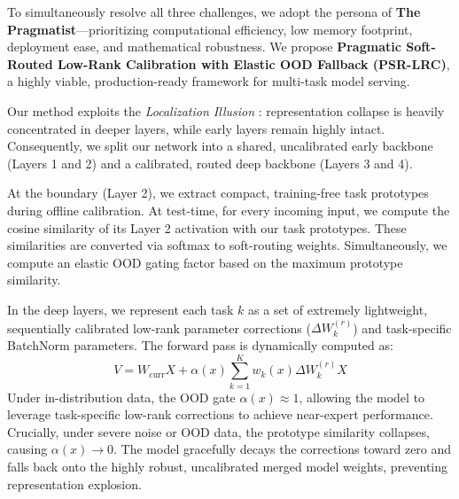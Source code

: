 \documentclass{article}
\theoremstyle{plain}
\theoremstyle{definition}
\theoremstyle{remark}
\begin{document}
To simultaneously resolve all three challenges, we adopt the persona of \textbf{The Pragmatist}—prioritizing computational efficiency, low memory footprint, deployment ease, and mathematical robustness. We propose \textbf{Pragmatic Soft-Routed Low-Rank Calibration with Elastic OOD Fallback (PSR-LRC)}, a highly viable, production-ready framework for multi-task model serving.

Our method exploits the \emph{Localization Illusion} \cite{minimalist2026mspr}: representation collapse is heavily concentrated in deeper layers, while early layers remain highly intact. Consequently, we split our network into a shared, uncalibrated early backbone (Layers 1 and 2) and a calibrated, routed deep backbone (Layers 3 and 4). 

At the boundary (Layer 2), we extract compact, training-free task prototypes during offline calibration. At test-time, for every incoming input, we compute the cosine similarity of its Layer 2 activation with our task prototypes. These similarities are converted via softmax to soft-routing weights. Simultaneously, we compute an elastic OOD gating factor based on the maximum prototype similarity.

In the deep layers, we represent each task $k$ as a set of extremely lightweight, sequentially calibrated low-rank parameter corrections ($\Delta W_k^{(r)}$) and task-specific BatchNorm parameters. The forward pass is dynamically computed as:
\begin{equation}
    V = W_{\text{curr}} X + \alpha(x) \sum_{k=1}^K w_k(x) \Delta W_k^{(r)} X
\end{equation}
Under in-distribution data, the OOD gate $\alpha(x) \approx 1$, allowing the model to leverage task-specific low-rank corrections to achieve near-expert performance. Crucially, under severe noise or OOD data, the prototype similarity collapses, causing $\alpha(x) \to 0$. The model gracefully decays the corrections toward zero and falls back onto the highly robust, uncalibrated merged model weights, preventing representation explosion.
\end{document}
